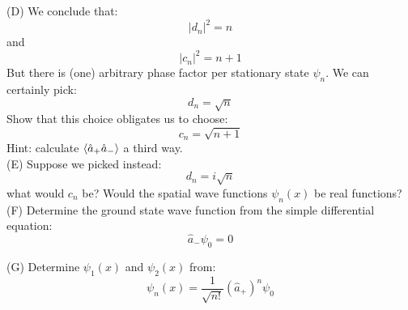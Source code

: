 \documentclass[12pt]{article}
\begin{document}
\newpage


\noindent
(D) We conclude that:
$$|d_n|^2 = n$$
and
$$|c_n|^2 = n+1$$
But there is (one) arbitrary phase factor per stationary state $\psi_n$.  We can certainly pick:
$$d_n = \sqrt{n}$$
Show that this choice obligates us to choose:
$$c_n = \sqrt{n+1}$$
Hint: calculate $\braket{\hat{a}_+\hat{a}_-}$ a third way.\\[5pt]

\noindent
(E) Suppose we picked instead:
$$d_n = i\sqrt{n}$$
what would $c_n$ be?  Would the spatial wave functions $\psi_n(x)$ be real functions?\\[5pt]

\noindent
(F) Determine the ground state wave function from the simple differential equation:
$$\hat{a}_- \psi_0 = 0$$

\noindent
(G) Determine $\psi_1(x)$ and $\psi_2(x)$ from:
$$\psi_n(x) = \frac{1}{\sqrt{n!}}(\hat{a}_+)^n \psi_0$$
\end{document}
